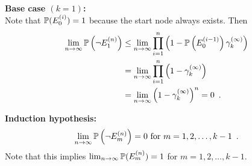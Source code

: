 \noindent
\textbf{Base case $(k = 1)$:}\\
Note that $\mathbb{P}(E^{(i)}_{0}) = 1$ because the start node always exists. Then 
\begin{equation}
\begin{split}
    \lim_{n \rightarrow \infty} \mathbb{P}\left( \neg E^{(n)}_1 \right) 
        &\leq \lim_{n \rightarrow \infty} \prod_{i=1}^n \left(1 - \mathbb{P}\left( E^{(i-1)}_{0} \right) \gamma_k^{(\infty)} \right) \\
        &=    \lim_{n \rightarrow \infty} \prod_{i=1}^n \left(1 - \gamma_k^{(\infty)} \right) \\
        &=\lim_{n \rightarrow \infty} \left(1 - \gamma_k^{(\infty)} \right)^n = 0 \enspace .
\end{split}
\end{equation}

\noindent
\textbf{Induction hypothesis: }
\begin{equation}
    \lim_{n \rightarrow \infty} \mathbb{P}\left( \neg E^{(n)}_m \right) = 0 \textrm{ for } m = 1, 2, \dots, k - 1 \enspace .
    \label{eqn:induction_hypothesis}
\end{equation}
Note that this implies $\lim_{n \rightarrow \infty} \mathbb{P}( E^{(n)}_m ) = 1$ for $m = 1, 2, \dots, k - 1$.\\

